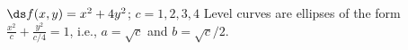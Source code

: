 {$\ds f(x,y) = x^2+4y^2$; $c = 1,2,3,4$\label{12_01_ex_22a}}
{Level curves are ellipses of the form $\frac{x^2}{c}+\frac{y^2}{c/4}=1$, i.e., $a=\sqrt{c}$ and $b=\sqrt{c}/2$.\\
}